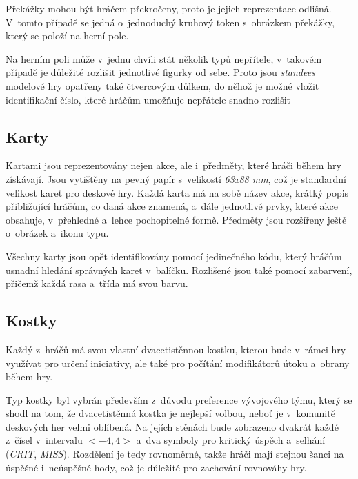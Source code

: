 Překážky mohou být hráčem překročeny, proto je jejich reprezentace odlišná. V~tomto případě se jedná o~jednoduchý kruhový token s~obrázkem překážky, který se položí na herní pole.

Na herním poli může v~jednu chvíli stát několik typů nepřítele, v~takovém případě je důležité rozlišit jednotlivé figurky od sebe. Proto jsou \textit{standees} modelové hry opatřeny také čtvercovým důlkem, do něhož je možné vložit identifikační číslo, které hráčům umožňuje nepřátele snadno rozlišit

\subsection{Karty}
\label{subsec:design_cards}

Kartami jsou reprezentovány nejen akce, ale i~předměty, které hráči během hry získávají. Jsou vytištěny na pevný papír s~velikostí \textit{63x88 mm}, což je standardní velikost karet pro deskové hry. Každá karta má na sobě název akce, krátký popis přibližující hráčům, co daná akce znamená, a~dále jednotlivé prvky, které akce obsahuje, v~přehledné a~lehce pochopitelné formě. Předměty jsou rozšířeny ještě o~obrázek a~ikonu typu.

Všechny karty jsou opět identifikovány pomocí jedinečného kódu, který hráčům usnadní hledání správných karet v~balíčku. Rozlišené jsou také pomocí zabarvení, přičemž každá rasa a~třída má svou barvu.

\subsection{Kostky}
\label{subsec:design_dice}

Každý z~hráčů má svou vlastní dvacetistěnnou kostku, kterou bude v~rámci hry využívat pro určení iniciativy, ale také pro počítání modifikátorů útoku a~obrany během hry.

Typ kostky byl vybrán především z~důvodu preference vývojového týmu, který se shodl na tom, že dvacetistěnná kostka je nejlepší volbou, neboť je v~komunitě deskových her velmi oblíbená. Na jejích stěnách bude zobrazeno dvakrát každé z~čísel v~intervalu $<-4, 4>$ a~dva symboly pro kritický úspěch a~selhání (\textit{CRIT}, \textit{MISS}). Rozdělení je tedy rovnoměrné, takže hráči mají stejnou šanci na úspěšné i~neúspěšné hody, což je důležité pro zachování rovnováhy hry.
